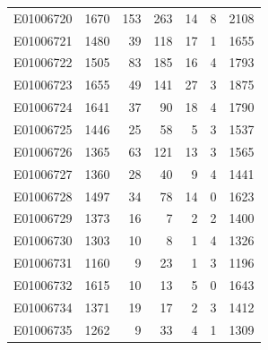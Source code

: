 \documentclass[
  letterpaper,
  DIV=11,
  numbers=noendperiod]{scrreprt}
\begin{document}
\begin{tabular}{lrrrrrr}
E01006720     &    1670 &     153 &                   263 &                              14 &                       8 &              2108 \\
E01006721     &    1480 &      39 &                   118 &                              17 &                       1 &              1655 \\
E01006722     &    1505 &      83 &                   185 &                              16 &                       4 &              1793 \\
E01006723     &    1655 &      49 &                   141 &                              27 &                       3 &              1875 \\
E01006724     &    1641 &      37 &                    90 &                              18 &                       4 &              1790 \\
E01006725     &    1446 &      25 &                    58 &                               5 &                       3 &              1537 \\
E01006726     &    1365 &      63 &                   121 &                              13 &                       3 &              1565 \\
E01006727     &    1360 &      28 &                    40 &                               9 &                       4 &              1441 \\
E01006728     &    1497 &      34 &                    78 &                              14 &                       0 &              1623 \\
E01006729     &    1373 &      16 &                     7 &                               2 &                       2 &              1400 \\
E01006730     &    1303 &      10 &                     8 &                               1 &                       4 &              1326 \\
E01006731     &    1160 &       9 &                    23 &                               1 &                       3 &              1196 \\
E01006732     &    1615 &      10 &                    13 &                               5 &                       0 &              1643 \\
E01006734     &    1371 &      19 &                    17 &                               2 &                       3 &              1412 \\
E01006735     &    1262 &       9 &                    33 &                               4 &                       1 &              1309 \\

\end{tabular}
\end{document}
